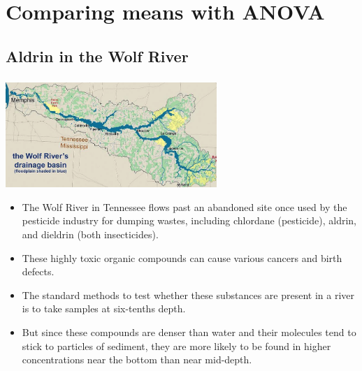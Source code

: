 
\section{Comparing means with ANOVA}


\subsection{Aldrin in the Wolf River}


\begin{frame}
\frametitle{}

\begin{center}
\includegraphics[width=0.6\textwidth]{7-5_anova/figures/aldrin/wolf}
\end{center}

{\small
\begin{itemize}

\item  The Wolf River in Tennessee flows past an abandoned site once used by the pesticide industry for dumping wastes, including chlordane (pesticide), aldrin, and dieldrin (both insecticides).

\pause

\item These highly toxic organic compounds can cause various cancers and birth defects.

\pause

\item The standard methods to test whether these substances are present in a river is to take samples at six-tenths depth. 

\pause

\item But since these compounds are denser than water and their molecules tend to stick to particles of sediment, they are more likely to be found in higher concentrations near the bottom than near mid-depth.

\end{itemize}
}

\end{frame}

